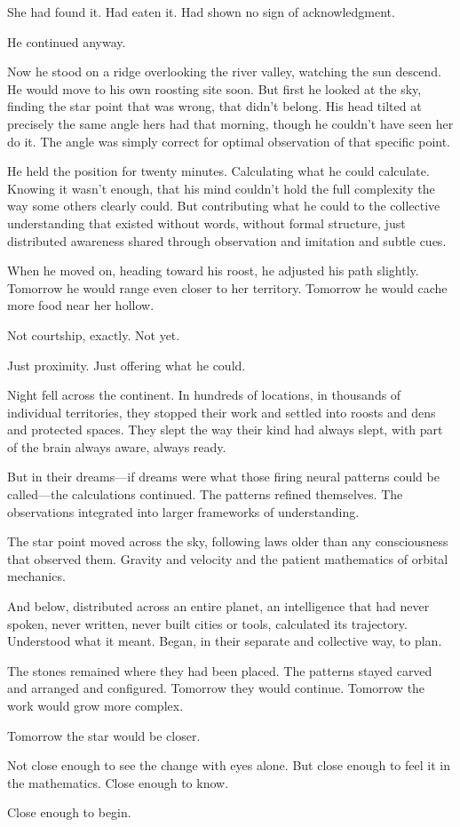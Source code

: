 She had found it. Had eaten it. Had shown no sign of acknowledgment.

He continued anyway.

Now he stood on a ridge overlooking the river valley, watching the sun descend. He would move to his own roosting site soon. But first he looked at the sky, finding the star point that was wrong, that didn't belong. His head tilted at precisely the same angle hers had that morning, though he couldn't have seen her do it. The angle was simply correct for optimal observation of that specific point.

He held the position for twenty minutes. Calculating what he could calculate. Knowing it wasn't enough, that his mind couldn't hold the full complexity the way some others clearly could. But contributing what he could to the collective understanding that existed without words, without formal structure, just distributed awareness shared through observation and imitation and subtle cues.

When he moved on, heading toward his roost, he adjusted his path slightly. Tomorrow he would range even closer to her territory. Tomorrow he would cache more food near her hollow.

Not courtship, exactly. Not yet.

Just proximity. Just offering what he could.

\scenebreak

Night fell across the continent. In hundreds of locations, in thousands of individual territories, they stopped their work and settled into roosts and dens and protected spaces. They slept the way their kind had always slept, with part of the brain always aware, always ready.

But in their dreams—if dreams were what those firing neural patterns could be called—the calculations continued. The patterns refined themselves. The observations integrated into larger frameworks of understanding.

The star point moved across the sky, following laws older than any consciousness that observed them. Gravity and velocity and the patient mathematics of orbital mechanics.

And below, distributed across an entire planet, an intelligence that had never spoken, never written, never built cities or tools, calculated its trajectory. Understood what it meant. Began, in their separate and collective way, to plan.

The stones remained where they had been placed. The patterns stayed carved and arranged and configured. Tomorrow they would continue. Tomorrow the work would grow more complex.

Tomorrow the star would be closer.

Not close enough to see the change with eyes alone. But close enough to feel it in the mathematics. Close enough to know.

Close enough to begin.

